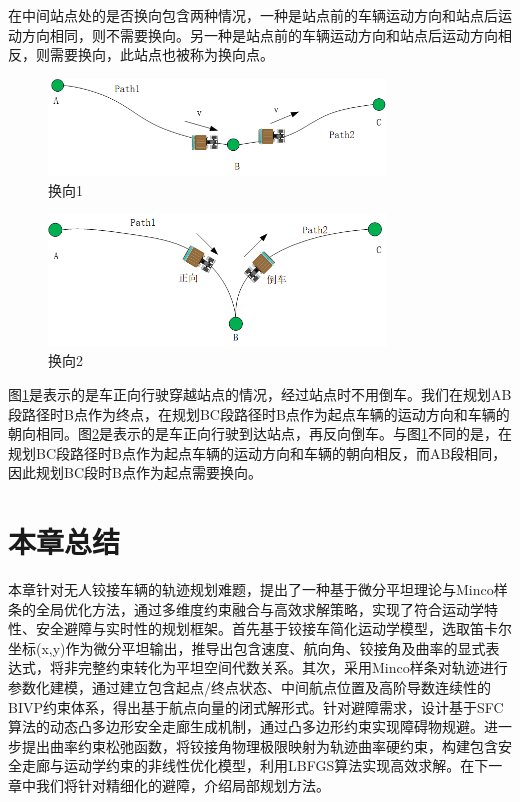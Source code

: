 \documentclass[master,academic]{ysuthesis} %
\begin{document}
		在中间站点处的是否换向包含两种情况，一种是站点前的车辆运动方向和站点后运动方向相同，则不需要换向。另一种是站点前的车辆运动方向和站点后运动方向相反，则需要换向，此站点也被称为换向点。
		\begin{figure}[!ht]
			\centering
			\includegraphics[width=0.8\textwidth]{换向1.png}
			\caption{换向1}
			\label{fig:换向1}
		\end{figure}
		\begin{figure}[!ht]
			\centering
			\includegraphics[width=0.8\textwidth]{换向2.png}
			\caption{换向2}
			\label{fig:换向2}
		\end{figure}
		图\ref{fig:换向1}是表示的是车正向行驶穿越站点的情况，经过站点时不用倒车。我们在规划AB段路径时B点作为终点，在规划BC段路径时B点作为起点车辆的运动方向和车辆的朝向相同。图\ref{fig:换向2}是表示的是车正向行驶到达站点，再反向倒车。与图\ref{fig:换向1}不同的是，在规划BC段路径时B点作为起点车辆的运动方向和车辆的朝向相反，而AB段相同，因此规划BC段时B点作为起点需要换向。

	\section{本章总结}
	本章针对无人铰接车辆的轨迹规划难题，提出了一种基于微分平坦理论与Minco样条的全局优化方法，通过多维度约束融合与高效求解策略，实现了符合运动学特性、安全避障与实时性的规划框架。首先基于铰接车简化运动学模型，选取笛卡尔坐标(x,y)作为微分平坦输出，推导出包含速度、航向角、铰接角及曲率的显式表达式，将非完整约束转化为平坦空间代数关系。其次，采用Minco样条对轨迹进行参数化建模，通过建立包含起点/终点状态、中间航点位置及高阶导数连续性的BIVP约束体系，得出基于航点向量的闭式解形式。针对避障需求，设计基于SFC算法的动态凸多边形安全走廊生成机制，通过凸多边形约束实现障碍物规避。进一步提出曲率约束松弛函数，将铰接角物理极限映射为轨迹曲率硬约束，构建包含安全走廊与运动学约束的非线性优化模型，利用LBFGS算法实现高效求解。在下一章中我们将针对精细化的避障，介绍局部规划方法。
	
\end{document}
